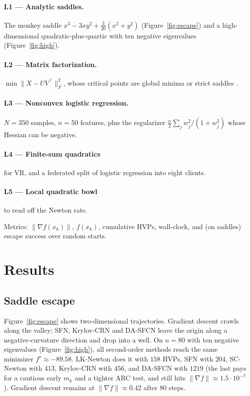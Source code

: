 \documentclass[11pt,a4paper]{article}
\theoremstyle{definition}
\begin{document}
\paragraph{L1 --- Analytic saddles.}
The monkey saddle $x^3-3xy^2+\tfrac{3}{20}(x^2+y^2)$ (Figure~\ref{fig:escape})
and a high-dimensional quadratic-plus-quartic with ten negative eigenvalues
(Figure~\ref{fig:high}).

\paragraph{L2 --- Matrix factorization.}
$\min\|X-UV^\top\|_F^2$, whose critical points are global minima or strict
saddles \cite{ge2016}.

\paragraph{L3 --- Nonconvex logistic regression.}
$N=350$ samples, $n=50$ features, plus the regularizer
$\tfrac{\alpha}{2}\sum_j w_j^2/(1+w_j^2)$ whose Hessian can be negative.

\paragraph{L4 --- Finite-sum quadratics} for VR, and a federated split of
logistic regression into eight clients.

\paragraph{L5 --- Local quadratic bowl} to read off the Newton rate.

Metrics: $\|\nabla f(x_k)\|$, $f(x_k)$, cumulative HVPs, wall-clock,
and (on saddles) escape success over random starts.

\section{Results}
\subsection{Saddle escape}
Figure~\ref{fig:escape} shows two-dimensional trajectories. Gradient descent
crawls along the valley; SFN, Krylov-CRN and DA-SFCN leave the origin along
a negative-curvature direction and drop into a well.
On $n=80$ with ten negative eigenvalues (Figure~\ref{fig:high}), all
second-order methods reach the same minimizer $f^\star\approx -89.58$.
LK-Newton does it with $158$ HVPs, SFN with $204$, SC-Newton with $413$,
Krylov-CRN with $456$, and DA-SFCN with $1219$ (the last pays for a
cautious early $m_k$ and a tighter ARC test, and still hits
$\|\nabla f\|\approx 1.5\cdot 10^{-7}$).
Gradient descent remains at $\|\nabla f\|\approx 0.42$ after $80$ steps.
\end{document}
